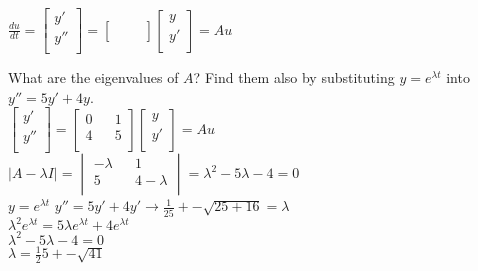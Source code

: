 \documentclass[10pt,twoside,reqno]{article}
\begin{document}
\begin{enumerate}
\begin{center}
$
$$
\frac{du}{dt} =
\begin{bmatrix}
y'\\
y''\\
\end{bmatrix}
=
\begin{bmatrix}
&&\\
&&\\
\end{bmatrix}
\begin{bmatrix}
y\\
y'\\
\end{bmatrix}
= Au
$$
$\\
\end{center}
What are the eigenvalues of $A$? Find them also by substituting $y = e^{\lambda t}$ into  $y'' = 5y' + 4y$.\\
$
$$
\begin{bmatrix}
y'\\
y''\\
\end{bmatrix}
=
\begin{bmatrix}
0 && 1\\
4 && 5\\
\end{bmatrix}
\begin{bmatrix}
y\\
y'\\
\end{bmatrix}
= Au
$$
$\\
$
$$
\left| A - \lambda I \right|
=
\begin{vmatrix}
-\lambda && 1\\
5 && 4-\lambda\\
\end{vmatrix}
=
\lambda^2 - 5\lambda - 4 = 0
$$
$\\
$y = e^{\lambda t}$
\hspace{3mm}
$y'' = 5y' + 4y' \rightarrow \frac{1}{25} +- \sqrt{25 + 16} = \lambda$\\
\hspace{45mm}
$\lambda^2e^{\lambda t} = 5 \lambda e^{\lambda t} + 4e^{\lambda t}$\\
\hspace{45mm}
$\lambda^2 - 5 \lambda - 4 = 0$\\
\hspace{45mm}
$\lambda = \frac{1}{2} 5 +- \sqrt{41}$\\

\end{enumerate}
\end{document}
